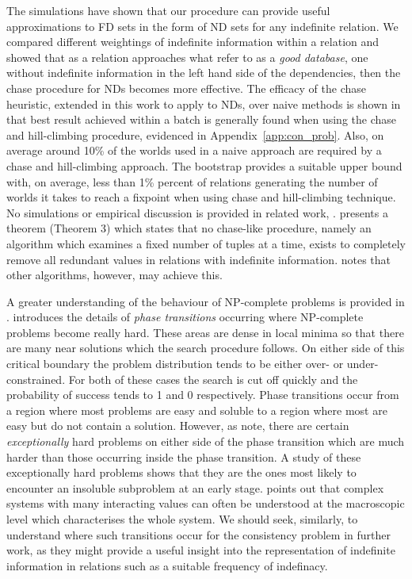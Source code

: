 The simulations have shown that our procedure can provide useful
approximations to FD sets in the form of ND sets for any indefinite
relation. We compared different weightings of indefinite information within
a relation and showed that as a relation approaches what \cite{vn95}
refer to as a {\em good database}, one without indefinite information
in the left hand side of the dependencies, then the chase procedure for
NDs becomes more effective. The efficacy of the chase heuristic, extended in
this work to apply to NDs, over naive methods is shown in that
best result achieved within a batch is generally found when using the 
chase and hill-climbing procedure, evidenced in Appendix~\ref{app:con_prob}. 
Also, on average around 10\% of 
the worlds used in 
a naive approach are required by a chase and hill-climbing approach.
The bootstrap provides a suitable upper bound with, on average, 
less than 1\% percent of relations generating the number of worlds it
takes to reach a fixpoint when using chase and hill-climbing technique.
No simulations or empirical discussion is provided in related work,
\cite{vn95,inv91}. \cite{imi91} presents a theorem (Theorem 3) which
states that no chase-like procedure, namely an algorithm which
examines a fixed number of tuples at a time, exists to completely
remove all redundant values in relations with indefinite
information. \cite{vn95} notes that other algorithms, however, may
achieve this.

\medskip
{}
A greater understanding of the behaviour of NP-complete problems
is provided in \cite{slm92,msl92}.  \cite{ckt91} introduces
the details of {\em phase transitions} occurring where NP-complete
problems become really hard.  These areas are dense in local
minima so that there are many near solutions which the search procedure
follows.  On either side of this critical boundary the 
problem distribution tends to be either over- or under- constrained.
For both of these cases the search is cut off quickly and the 
probability of success tends to 1 and 0 respectively. Phase
transitions  occur from a region where
most problems are easy and soluble to a region where most are
easy but do not contain a solution. However, as \cite{sg94} note, there are
certain {\em exceptionally} hard problems on either side
of the phase transition which are much harder than those occurring
inside the phase transition. A study of these exceptionally
hard problems shows that they are the ones most likely to
encounter an insoluble subproblem at an early stage. \cite{ckt91}
points out that complex systems with many
interacting values can often be understood at the
macroscopic level which characterises the whole system.
We should seek, similarly, 
to understand where such transitions occur for the consistency
problem in further work, as they might provide a useful insight into
the representation of indefinite information in relations such as a
suitable frequency of indefinacy.

